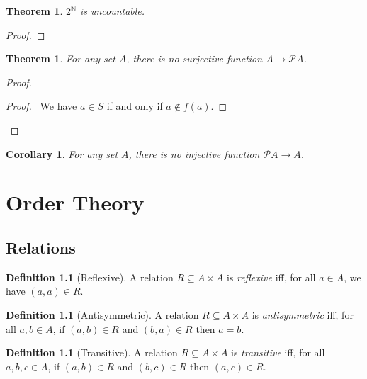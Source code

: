 \documentclass{book}
\let\qed\relax
\newtheorem{cor}{Corollary}[ax]
\newtheorem{thm}[ax]{Theorem}
\theoremstyle{definition}
\newtheorem{df}[ax]{Definition}
\begin{document}
\begin{thm}
$2^\mathbb{N}$ is uncountable.
\end{thm}

\begin{proof}
\pf
{}
\qed
\end{proof}

\begin{thm}
For any set $A$, there is no surjective function $A \rightarrow \mathcal{P} A$.
\end{thm}

\begin{proof}
\pf
{}
\begin{proof}
	\pf\ We have $a \in S$ if and only if $a \notin f(a)$.
\end{proof}
\qed
\end{proof}

\begin{cor}
For any set $A$, there is no injective function $\mathcal{P} A \rightarrow A$.
\end{cor}

\chapter{Order Theory}

\section{Relations}

\begin{df}[Reflexive]
A relation $R \subseteq A \times A$ is \emph{reflexive} iff, for all $a \in A$, we have $(a,a) \in R$.
\end{df}

\begin{df}[Antisymmetric]
A relation $R \subseteq A \times A$ is \emph{antisymmetric} iff, for all $a,b \in A$, if $(a,b) \in R$ and $(b,a) \in R$ then $a = b$.
\end{df}

\begin{df}[Transitive]
A relation $R \subseteq A \times A$ is \emph{transitive} iff, for all $a,b,c \in A$, if $(a,b) \in R$ and $(b,c) \in R$ then $(a,c) \in R$.
\end{df}
\end{document}
